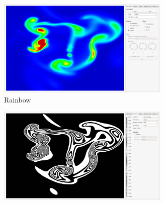 \begin{figure}[h!]
	\centering
	\begin{subfigure}{0.35\textwidth}
		\centering
		\includegraphics[width=0.9\textwidth, trim={35px 30px 430px 30px}, clip]{colormapping/img/rainbow}
		\caption{Rainbow}
		\label{fig:colormapping:intro:differntColorMaps:rainbow}
	\end{subfigure}
	\hspace{30px}
	\begin{subfigure}{0.35\textwidth}
		\centering
		\includegraphics[width=0.9\textwidth, trim={35px 30px 430px 30px}, clip]{colormapping/img/zebra_166}

\end{subfigure}
\end{figure}
